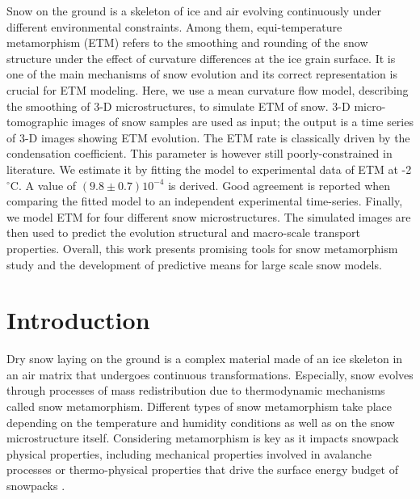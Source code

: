 \documentclass[draft,ms]{agujournal2019}
\begin{document}
Snow on the ground is a skeleton of ice and air evolving continuously under different environmental constraints. Among them, equi-temperature metamorphism (ETM) refers to the smoothing and rounding of the snow structure under the effect of curvature differences at the ice grain surface. It is one of the main mechanisms of snow evolution and its correct representation is crucial for ETM modeling. Here, we use a mean curvature flow model, describing the smoothing of 3-D microstructures, to simulate ETM of snow. 3-D micro-tomographic images of snow samples are used as input; the output is a time series of 3-D images showing ETM evolution. The ETM rate is classically driven by the condensation coefficient. This parameter is however still poorly-constrained in literature. We estimate it by fitting the model to experimental data of ETM at -2$^\circ$C. A value of $(9.8\pm0.7)10^{-4}$ is derived. Good agreement is reported when comparing the fitted model to an independent experimental time-series. Finally, we model ETM for four different snow microstructures. The simulated images are then used to predict the evolution structural and macro-scale transport properties. Overall, this work presents promising tools for snow metamorphism study and the development of predictive means for large scale snow models. 

\section{Introduction}
\label{sec:intro}
Dry snow laying on the ground is a complex material made of an ice skeleton in an air matrix that undergoes continuous transformations. Especially, snow evolves through processes of mass redistribution due to thermodynamic mechanisms called snow metamorphism. Different types of snow metamorphism take place depending on the temperature and humidity conditions as well as on the snow microstructure itself. Considering metamorphism is key as it impacts snowpack physical properties, including mechanical properties involved in avalanche processes or thermo-physical properties that drive the surface energy budget of snowpacks \cite{lehning_physical_2002, vionnet_detailed_2012}.\\
\end{document}
